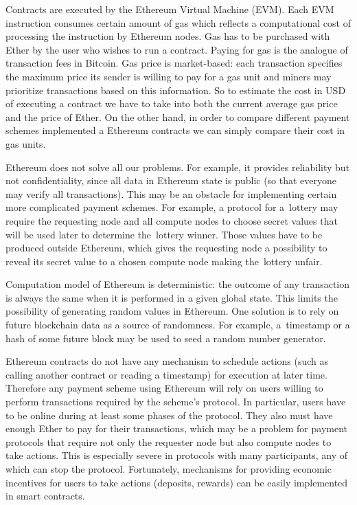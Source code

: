 \documentclass[a4paper]{article}
\begin{document}
    Contracts are executed by the Ethereum Virtual Machine (EVM)\cite{ETHERDEV}. Each EVM instruction consumes certain
    amount of gas which reflects a computational cost of processing the instruction by Ethereum nodes. Gas has to be
    purchased with Ether by the user who wishes to run a contract. Paying for gas is the analogue of transaction fees
    in Bitcoin. Gas price is market-based: each transaction specifies the maximum price its sender is willing to pay
    for a gas unit and miners may prioritize transactions based on this information. So to estimate the cost in USD
    of executing a contract we have to take into both the current average gas price and the price of Ether.
    On the other hand, in order to compare different payment schemes implemented a Ethereum contracts we can simply
    compare their cost in gas units.

    Ethereum does not solve all our problems. For example, it provides reliability but not confidentiality, since all
    data in Ethereum state is public (so that everyone may verify all transactions). This may be an obstacle for
    implementing certain more complicated payment schemes. For example, a protocol for a~lottery may require the
    requesting node and all compute nodes to choose secret values that will be used later to determine the~lottery
    winner. Those values have to be produced outside Ethereum, which gives the requesting node a possibility to
    reveal its secret value to a chosen compute node making the~lottery unfair.

    Computation model of Ethereum is deterministic: the outcome of any transaction is always the same when it is
    performed in a given global state. This limits the possibility of generating random values in Ethereum.
    One solution is to rely on future blockchain data as a source of randomness. For example, a~timestamp or a hash of
    some future block may be used to seed a random number generator.

    Ethereum contracts do not have any mechanism to schedule actions (such as calling another contract or reading a
    timestamp) for execution at later time. Therefore any payment scheme using Ethereum will rely on users willing
    to perform transactions required by the scheme's protocol. In particular, users have to be online during at
    least some phases of the protocol. They also must have enough Ether to pay for their transactions, which may be
    a problem for payment protocols that require not only the requester node but also compute nodes to take actions.
    This is especially severe in protocols with many participants, any of which can stop the protocol.
    Fortunately, mechanisms for providing economic incentives for users to take actions (deposits, rewards)
    can be easily implemented in smart contracts.
\end{document}
